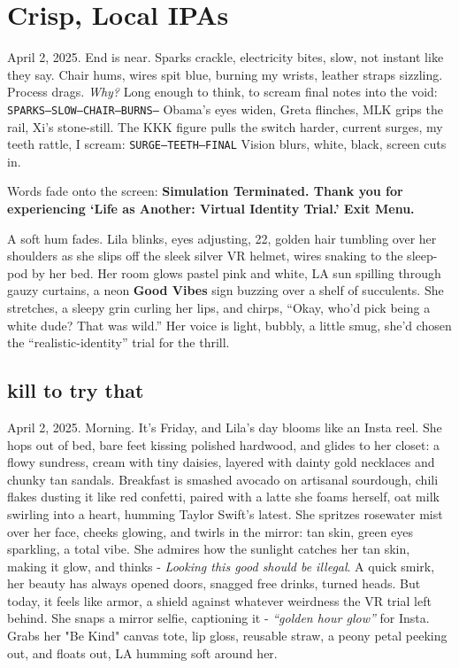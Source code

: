 \documentclass[12pt]{article}
\newcommand{\note}[1]{\texttt{#1}}
\begin{document}
\section{Crisp, Local IPAs}

April 2, 2025. End is near. Sparks crackle, electricity bites, slow, not instant like they say. Chair hums, wires spit blue, burning my wrists, leather straps sizzling. Process drags. \textit{Why?} Long enough to think, to scream final notes into the void: \note{SPARKS—SLOW—CHAIR—BURNS—} Obama’s eyes widen, Greta flinches, MLK grips the rail, Xi’s stone-still. The KKK figure pulls the switch harder, current surges, my teeth rattle, I scream: \note{SURGE—TEETH—FINAL} Vision blurs, white, black, screen cuts in.

Words fade onto the screen: \textbf{Simulation Terminated. Thank you for experiencing ‘Life as Another: Virtual Identity Trial.’ Exit Menu.}

A soft hum fades. Lila blinks, eyes adjusting, 22, golden hair tumbling over her shoulders as she slips off the sleek silver VR helmet, wires snaking to the sleep-pod by her bed. Her room glows pastel pink and white, LA sun spilling through gauzy curtains, a neon \textbf{Good Vibes} sign buzzing over a shelf of succulents. She stretches, a sleepy grin curling her lips, and chirps, “Okay, who’d pick being a white dude? That was wild.” Her voice is light, bubbly, a little smug, she’d chosen the “realistic-identity” trial for the thrill.

\subsection*{kill to try that}

April 2, 2025. Morning. It’s Friday, and Lila’s day blooms like an Insta reel. She hops out of bed, bare feet kissing polished hardwood, and glides to her closet: a flowy sundress, cream with tiny daisies, layered with dainty gold necklaces and chunky tan sandals. Breakfast is smashed avocado on artisanal sourdough, chili flakes dusting it like red confetti, paired with a latte she foams herself, oat milk swirling into a heart, humming Taylor Swift’s latest. She spritzes rosewater mist over her face, cheeks glowing, and twirls in the mirror: tan skin, green eyes sparkling, a total vibe. She admires how the sunlight catches her tan skin, making it glow, and thinks - \textit{Looking this good should be illegal}. A quick smirk, her beauty has always opened doors, snagged free drinks, turned heads. But today, it feels like armor, a shield against whatever weirdness the VR trial left behind. She snaps a mirror selfie, captioning it - \textit{“golden hour glow”} for Insta. Grabs her "Be Kind" canvas tote, lip gloss, reusable straw, a peony petal peeking out, and floats out, LA humming soft around her.
\end{document}
